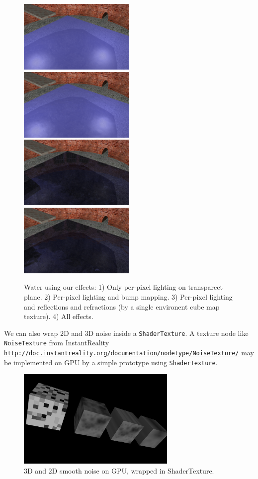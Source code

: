 \documentclass{acmsiggraph}                     %
\newcommand*{\myhref}[2]{\texttt{\href{#1}{\nolinkurl{#2}}}}
\begin{document}
\begin{figure}[t]
  \centering
  \includegraphics[width=2.2in]{water_shaders_0}
  \includegraphics[width=2.2in]{water_shaders_1}
  \includegraphics[width=2.2in]{water_shaders_2}
  \includegraphics[width=2.2in]{water_shaders_3}
  \caption{Water using our effects: 1) Only per-pixel lighting on transparect
plane. 2) Per-pixel lighting and bump mapping. 3) Per-pixel lighting and
reflections and refractions (by a single environent cube map texture).
4) All effects.}
\end{figure}

We can also wrap 2D and 3D noise inside a \texttt{ShaderTexture}.
A texture node like \texttt{NoiseTexture} from InstantReality
\myhref{http://doc.instantreality.org/documentation/nodetype/NoiseTexture/}{http://doc.instantreality.org/documentation/nodetype/NoiseTexture/}
may be implemented on GPU by a simple prototype using \texttt{ShaderTexture}.

\begin{figure}[H]
  \centering
  \includegraphics[width=3in]{noise}
  \caption{3D and 2D smooth noise on GPU, wrapped in ShaderTexture.}
\end{figure}
\end{document}
